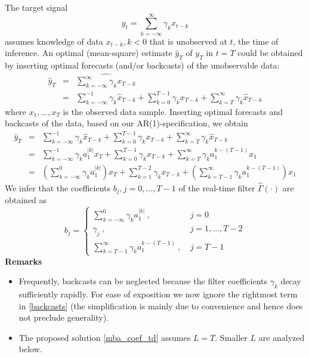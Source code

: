 \documentclass[a4paper]{book}
\begin{document}
The target signal 
\begin{equation}\label{target_ventimil}
y_t=\sum_{k=-\infty}^\infty\gamma_kx_{t-k}
\end{equation}
assumes knowledge of data $x_{t-k}, k<0$ that is unobserved at $t$, the time of inference. An optimal (mean-square) estimate $\hat{y}_T$ of $y_T$ in $t=T$ could be obtained by inserting optimal forecasts (and/or backcasts) of the unobservable data:
\begin{eqnarray*}
\hat{y}_T&=&\widehat{\sum_{k=-\infty}^{\infty}\gamma_kx_{T-k}}\\
&=&\sum_{k=-\infty}^{-1}\gamma_k\hat{x}_{T-k}+\sum_{k=0}^{T-1} \gamma_k{x}_{T-k}+\sum_{k=T}^{\infty}\gamma_k\hat{x}_{T-k}
\end{eqnarray*}
where $x_1,...,x_T$ is the observed data sample.
Inserting optimal forecasts and backcasts of the data, based on our AR(1)-specification, we obtain
\begin{eqnarray}
\hat{y}_T&=&\sum_{k=-\infty}^{-1}\gamma_k\hat{x}_{T-k}+\sum_{k=0}^{T-1} \gamma_k{x}_{T-k}+\sum_{k=T}^{\infty}\gamma_k\hat{x}_{T-k}\nonumber\\
&=&\sum_{k=-\infty}^{-1}\gamma_ka_1^{|k|}{x}_{T}+\sum_{k=0}^{T-1} \gamma_k{x}_{T-k}+\sum_{k=T}^{\infty}\gamma_k a_1^{k-(T-1)}{x}_1\label{backcasts}\\
&=&\left(\sum_{k=-\infty}^{0}\gamma_ka_1^{|k|}\right){x}_{T}+\sum_{k=1}^{T-2} \gamma_k{x}_{T-k}+\left(\sum_{k=T-1}^{\infty}\gamma_k a_1^{k-(T-1)}\right){x}_1\nonumber
\end{eqnarray}
We infer that the coefficients ${b}_j, j=0,...,T-1$ of the real-time filter $\hat{\Gamma}(\cdot)$ are obtained as
\begin{equation}\label{mba_coef_td}
{b}_j=\left\{\begin{array}{cc}\sum_{k=-\infty}^{0}\gamma_ka_1^{|k|}~,&~j=0\\\gamma_{j}~,&~j=1,...,T-2\\
\sum_{k=T-1}^{\infty}\gamma_k a_1^{k-(T-1)}~,&~j=T-1\end{array}\right.
\end{equation}
\textbf{Remarks}
\begin{itemize}
\item Frequently, backcasts can be neglected because the filter coefficients $\gamma_k$ decay sufficiently rapidly. For ease of exposition we now ignore the rightmost term in \ref{backcasts} (the simplification is mainly due to convenience and hence does not preclude generality). 
\item The proposed solution \ref{mba_coef_td} assumes $L=T$. Smaller $L$ are analyzed below. 
\end{itemize}
\end{document}
